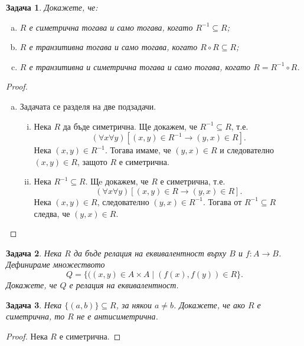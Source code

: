 \documentclass[a4paper]{article}
\newtheorem{problem}{Задача}
\begin{document}
  
\begin{problem}
  Докажете, че:
  \begin{enumerate}[a)]
  \item
    $R$ е симетрична тогава и само тогава, когато $R^{-1}\subseteq R$;
  \item
    $R$ е транзитивна тогава и само тогава, когато $R\circ R\subseteq R$;
  \item
    $R$ е транзитивна и симетрична тогава и само тогава, когато $R = R^{-1}\circ R$.
\end{enumerate}
\end{problem}
\begin{proof}
  \begin{enumerate}[a)]
  \item
    Задачата се разделя на две подзадачи.
    \begin{enumerate}[(i)]
    \item
      Нека $R$ да бъде симетрична. Ще докажем, че $R^{-1}\subseteq R$, т.е.
      \[(\forall x\forall y)[(x,y)\in R^{-1} \rightarrow (y,x)\in R].\]
      Нека $(x,y)\in R^{-1}$. Тогава имаме, че $(y,x)\in R$ и следователно $(x,y)\in R$,
      защото $R$ е симетрична.
    \item
      Нека $R^{-1}\subseteq R$. Щe докажем, че $R$ е симетрична, т.е.
      \[(\forall x\forall y)[(x,y)\in R \rightarrow (y,x)\in R].\]
      Нека $(x,y)\in R$, следователно $(y,x)\in R^{-1}$.
      Тогава от $R^{-1}\subseteq R$ следва, че $(y,x)\in R$.
    \end{enumerate}
  \end{enumerate}
\end{proof}


\begin{problem}
  Нека $R$ да бъде релация на еквивалентност върху $B$ и $f:A\to B$.
  Дефинираме множеството \[Q = \{((x,y)\in A\times A\mid (f(x),f(y))\in R\}.\]
  Докажете, че $Q$ е релация на еквивалентност.
\end{problem}

\begin{problem}
  Нека $\{(a,b)\}\subseteq R$, за някои $a\neq b$.
  Докажете, че ако $R$ е симетрична, то $R$ не е антисиметрична.
\end{problem}
\begin{proof}
  Нека $R$ е симетрична.
\end{proof}
\end{document}
